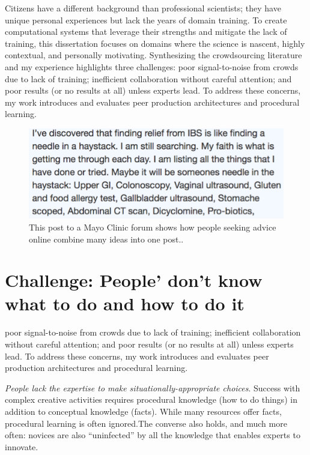 Citizens have a different background than professional scientists; they have unique personal experiences
but lack the years of domain training. To create computational systems that leverage
their strengths and mitigate the lack of training, this dissertation focuses on domains where the science is nascent,
highly contextual, and personally motivating. Synthesizing the crowdsourcing literature and my
experience highlights three challenges: poor signal-to-noise from crowds due to lack of training;
inefficient collaboration without careful attention; and poor results (or no results at all) unless experts
lead. To address these concerns, my work introduces and evaluates peer production architectures
and procedural learning.

\begin{figure}[b] 
  \centering
  \includegraphics[width=1.0\textwidth]{figures/docent/fig-1.png}
  \caption[]
{This post to a Mayo Clinic forum shows how people
seeking advice online combine many ideas into one post..}
  \label{fig:docent-1}
\end{figure}


\section{Challenge: People' don't know what to do and how to do it}

poor signal-to-noise from crowds due to lack of training; inefficient collaboration without careful attention; and poor results (or no results at all) unless experts lead. To address these concerns, my work introduces and evaluates peer production architectures and procedural learning.

\textit{People lack the expertise to make situationally-appropriate choices}. 
Success with complex creative activities requires procedural
knowledge (how to do things) in addition to conceptual
knowledge (facts). While many resources offer facts, procedural
learning is often ignored.The converse also holds, and much more often: novices are also
“uninfected” by all the knowledge that enables experts to
innovate.

